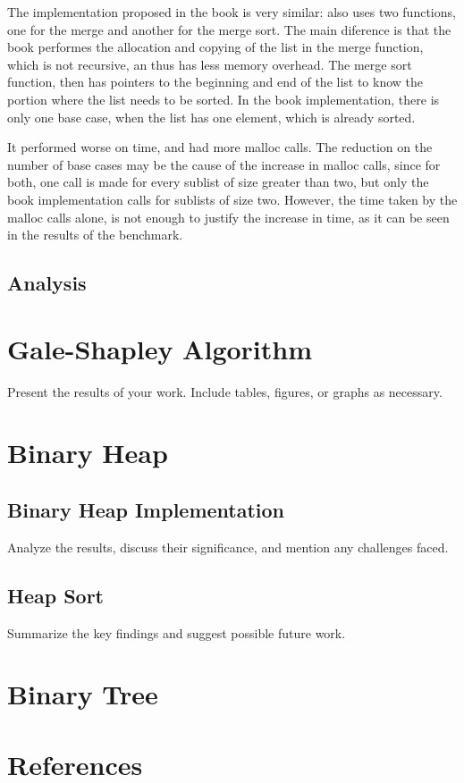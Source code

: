 \documentclass[a4paper,12pt,twocolumn]{article}
\begin{document}
The implementation proposed in the book is very similar:
also uses two functions, one for the merge and another for the merge sort.
The main diference is that the book performes the allocation and copying of the list in the merge function, which is not recursive, an thus has less memory overhead.
The merge sort function, then has pointers to the beginning and end of the list to know the portion where the list needs to be sorted.
In the book implementation, there is only one base case, when the list has one element, which is already sorted.

It performed worse on time, and had more malloc calls.
The reduction on the number of base cases may be the cause of the increase in malloc calls, since for both, one call is made for every sublist of size greater than two, but only the book implementation calls for sublists of size two. However, the time taken by the malloc calls alone, is not enough to justify the increase in time, as it can be seen in the results of the benchmark.

\subsection{Analysis}
\label{sec:benchmark}


\section{Gale-Shapley Algorithm}
\label{sec:gale-shapley}
Present the results of your work. Include tables, figures, or graphs as necessary.

\section{Binary Heap}
\label{sec:binary-heap}
\subsection{Binary Heap Implementation}
Analyze the results, discuss their significance, and mention any challenges faced.

\subsection{Heap Sort}
Summarize the key findings and suggest possible future work.


\section{Binary Tree}
\label{sec:binary-tree}

\section*{References}
\printbibliography
\end{document}
